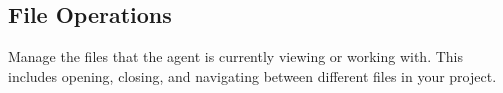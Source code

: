\subsection*{File Operations}

Manage the files that the agent is currently viewing or working with. This includes opening, closing, and navigating between different files in your project.